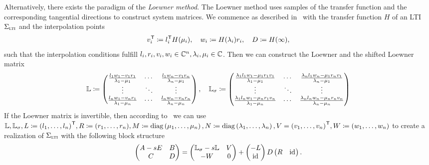 Alternatively, there exists the paradigm of the \emph{Loewner method}.
The Loewner method uses samples of the transfer function and the corresponding tangential directions to construct system matrices.
We commence as described in~\cite{BGD2020} with the transfer function $H$ of an \ac{LTI} $\Sigma_{\textnormal{\scshape lti}}$ and the interpolation points
\begin{equation*}
    v_i^{\mkern1mu \mathsf{T}} \coloneqq  l_i^{\mkern1mu \mathsf{T}} H(\mu_i),\quad w_i \coloneqq H(\lambda_i) r_i,\quad D\coloneqq H(\infty),
\end{equation*}
such that the interpolation conditions fulfill $l_i, r_i, v_i, w_i \in \mathbb{C}^n, \lambda_i, \mu_i \in \mathbb{C}$.
Then we can construct the Loewner and the shifted Loewner matrix
\begin{equation}\label{eq:loewner-matrices}
    \mathbb{L} \coloneqq \begin{pmatrix}
        \frac{l_1 w_1  - v_1 r_1}{\lambda_1 - \mu_1} & \cdots & \frac{l_1 w_n  - v_1 r_n}{\lambda_n - \mu_1} \\
        \vdots & \ddots & \vdots \\
        \frac{l_n w_1  - v_n r_1}{\lambda_1 - \mu_n} & \cdots & \frac{l_n w_n  - v_n r_n}{\lambda_n - \mu_n}
    \end{pmatrix},\quad \mathbb{L}_\sigma \coloneqq \begin{pmatrix}
        \frac{\lambda_1 l_1 w_1 - \mu_1 r_1 v_1}{\lambda_1 - \mu_1} & \cdots & \frac{\lambda_n l_1 w_n - \mu_1 r_n v_1}{\lambda_n - \mu_1} \\
        \vdots & \ddots & \vdots \\
        \frac{\lambda_1 l_n w_1 - \mu_n r_1 v_n}{\lambda_1 - \mu_n} & \cdots & \frac{\lambda_n l_n w_n - \mu_n r_n v_n}{\lambda_n - \mu_n}
    \end{pmatrix}
\end{equation}
If the Loewner matrix is invertible, then according to~\cite[Theorem~5.1]{BGD2020} we can use $\mathbb{L}, \mathbb{L}_\sigma, L \coloneqq {(l_1, \dots, l_n)}^{\mkern1mu \mathsf{T}}, R \coloneqq (r_1, \dots, r_n), M \coloneqq \mathop{}\!\mathrm{diag}\left(\mu_1, \dots, \mu_n\right), N \coloneqq \mathop{}\!\mathrm{diag}\left(\lambda_1, \dots, \lambda_n\right), V = {(v_1, \dots, v_n)}^{\mkern1mu \mathsf{T}}, W \coloneqq (w_1, \dots, w_n)$ to create a realization of $\Sigma_{\textnormal{\scshape lti}}$ with the following block structure
\begin{equation}\label{eq:loewner-realization}
    \begin{pmatrix}
        A - sE & B \\
        C & D
    \end{pmatrix} = \begin{pmatrix}
        \mathbb{L}_\sigma - s \mathbb{L} & V \\
        -W & 0
    \end{pmatrix} + \begin{pmatrix}
        -L \\
        \text{id}_{}
    \end{pmatrix} D \begin{pmatrix}
        R & \text{id}_{}
    \end{pmatrix}.
\end{equation}
